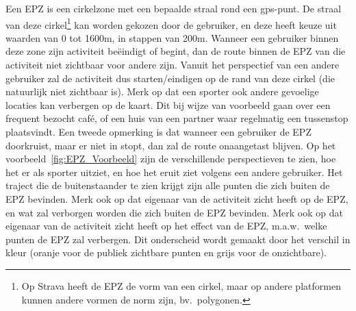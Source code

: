 Een EPZ is een cirkelzone met een bepaalde straal rond een gps-punt. De straal
van deze cirkel\footnote{Op Strava heeft de EPZ de vorm van een cirkel, maar op
    andere platformen kunnen andere vormen de norm zijn, bv.\ polygonen.} kan
worden gekozen door de gebruiker, en deze heeft keuze uit waarden van 0 tot
1600m, in stappen van 200m. Wanneer een gebruiker binnen deze zone zijn
activiteit beëindigt of begint, dan de route binnen de EPZ van die activiteit
niet zichtbaar voor andere zijn. Vanuit het perspectief van een andere
gebruiker zal de activiteit dus starten/eindigen op de rand van deze cirkel
(die natuurlijk niet zichtbaar is). Merk op dat een sporter ook andere
gevoelige locaties kan verbergen op de kaart. Dit bij wijze van voorbeeld gaan
over een frequent bezocht café, of een huis van een partner waar regelmatig een
tussenstop plaatsvindt. Een tweede opmerking is dat wanneer een gebruiker de
EPZ doorkruist, maar er niet in stopt, dan zal de route onaangetast blijven. Op
het voorbeeld~\ref{fig:EPZ_Voorbeeld} zijn de verschillende perspectieven te
zien, hoe het er als sporter uitziet, en hoe het eruit ziet volgens een andere
gebruiker. Het traject die de buitenstaander te zien krijgt zijn alle punten
die zich buiten de EPZ bevinden. Merk ook op dat eigenaar van de activiteit
zicht heeft op de EPZ, en wat zal verborgen worden die zich buiten de EPZ
bevinden. Merk ook op dat eigenaar van de activiteit zicht heeft op het effect
van de EPZ, m.a.w.\ welke punten de EPZ zal verbergen. Dit onderscheid wordt
gemaakt door het verschil in kleur (oranje voor de publiek zichtbare punten en
grijs voor de onzichtbare).
